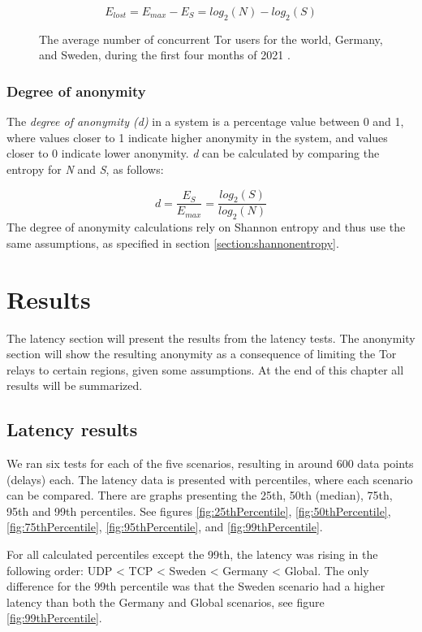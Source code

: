 \documentclass{kththesis}
\begin{document}
\[E_{lost} = E_{max} - E_{S} = log_{2}(N) - log_{2}(S)\]

\begin{figure}[htbp]
  \centering
  
  \caption{The average number of concurrent Tor users for the world, Germany, and Sweden, during the first four months of 2021 \parencite{tormetricsUserStats}.}
  \label{fig:numberOfTorUsers}
\end{figure}

\subsection{Degree of anonymity}
The \emph{degree of anonymity (d)} in a system is a percentage value between 0 and 1, where values closer to 1 indicate higher anonymity in the system, and values closer to 0 indicate lower anonymity. \emph{d} can be calculated by comparing the entropy for \emph{N} and \emph{S}, as follows:

\[d = \frac{E_{S}}{E_{max}} = \frac{log_{2}(S)}{log_{2}(N)}\]
The degree of anonymity calculations rely on Shannon entropy and thus use the same assumptions, as specified in section \ref{section:shannonentropy}.

\chapter{Results}
The latency section will present the results from the latency tests. The anonymity section will show the resulting anonymity as a consequence of limiting the Tor relays to certain regions, given some assumptions. At the end of this chapter all results will be summarized.

\section{Latency results}
We ran six tests for each of the five scenarios, resulting in around 600 data points (delays) each. The latency data is presented with percentiles, where each scenario can be compared. There are graphs presenting the 25th, 50th (median), 75th, 95th and 99th percentiles. See figures \ref{fig:25thPercentile}, \ref{fig:50thPercentile}, \ref{fig:75thPercentile}, \ref{fig:95thPercentile}, and \ref{fig:99thPercentile}.

For all calculated percentiles except the 99th, the latency was rising in the following order: UDP < TCP < Sweden < Germany < Global. The only difference for the 99th percentile was that the Sweden scenario had a higher latency than both the Germany and Global scenarios, see figure \ref{fig:99thPercentile}.
\end{document}
